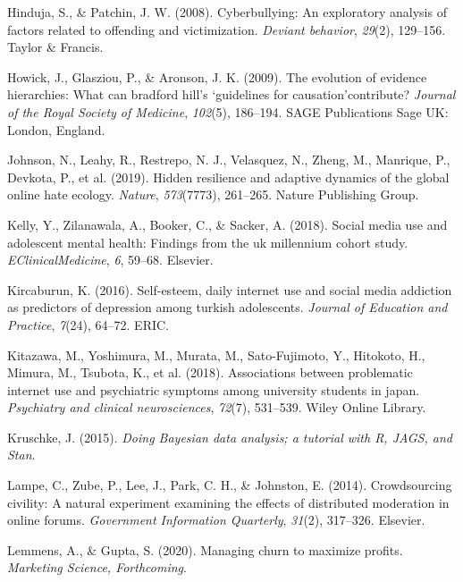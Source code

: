 \documentclass[10pt,dvipsnames]{scrartcl}
\begin{document}
\hypertarget{ref-hinduja2008cyberbullying}{}
Hinduja, S., \& Patchin, J. W. (2008). Cyberbullying: An exploratory
analysis of factors related to offending and victimization.
\emph{Deviant behavior}, \emph{29}(2), 129--156. Taylor \& Francis.

\hypertarget{ref-howick2009evolution}{}
Howick, J., Glasziou, P., \& Aronson, J. K. (2009). The evolution of
evidence hierarchies: What can bradford hill's `guidelines for
causation'contribute? \emph{Journal of the Royal Society of Medicine},
\emph{102}(5), 186--194. SAGE Publications Sage UK: London, England.

\hypertarget{ref-johnson2019hidden}{}
Johnson, N., Leahy, R., Restrepo, N. J., Velasquez, N., Zheng, M.,
Manrique, P., Devkota, P., et al. (2019). Hidden resilience and adaptive
dynamics of the global online hate ecology. \emph{Nature},
\emph{573}(7773), 261--265. Nature Publishing Group.

\hypertarget{ref-kelly2018social}{}
Kelly, Y., Zilanawala, A., Booker, C., \& Sacker, A. (2018). Social
media use and adolescent mental health: Findings from the uk millennium
cohort study. \emph{EClinicalMedicine}, \emph{6}, 59--68. Elsevier.

\hypertarget{ref-kircaburun2016self}{}
Kircaburun, K. (2016). Self-esteem, daily internet use and social media
addiction as predictors of depression among turkish adolescents.
\emph{Journal of Education and Practice}, \emph{7}(24), 64--72. ERIC.

\hypertarget{ref-kitazawa2018associations}{}
Kitazawa, M., Yoshimura, M., Murata, M., Sato-Fujimoto, Y., Hitokoto,
H., Mimura, M., Tsubota, K., et al. (2018). Associations between
problematic internet use and psychiatric symptoms among university
students in japan. \emph{Psychiatry and clinical neurosciences},
\emph{72}(7), 531--539. Wiley Online Library.

\hypertarget{ref-Kruschke2015}{}
Kruschke, J. (2015). \emph{Doing Bayesian data analysis; a tutorial with
R, JAGS, and Stan}.

\hypertarget{ref-lampe2014crowdsourcing}{}
Lampe, C., Zube, P., Lee, J., Park, C. H., \& Johnston, E. (2014).
Crowdsourcing civility: A natural experiment examining the effects of
distributed moderation in online forums. \emph{Government Information
Quarterly}, \emph{31}(2), 317--326. Elsevier.

\hypertarget{ref-lemmens2020managing}{}
Lemmens, A., \& Gupta, S. (2020). Managing churn to maximize profits.
\emph{Marketing Science, Forthcoming}.
\end{document}
